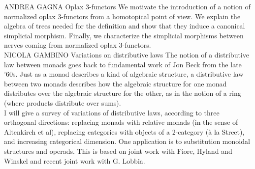 \documentclass[a3paper]{article}
\begin{document}


\talk
  {ANDREA GAGNA}
  {Oplax 3-functors}
  {We motivate the introduction of a notion of normalized oplax 3-functors from a homotopical point of view. We explain the algebra of trees needed for the definition and show that they induce a canonical simplicial morphism. Finally, we characterize the simplicial morphisms between nerves coming from normalized oplax 3-functors.}\\[1em]

\talk
  {NICOLA GAMBINO}
  {Variations on distributive laws}
  {The notion of a distributive law between monads goes back to fundamental work of Jon Beck from the late '60s. Just as a monad describes a kind of algebraic structure, a distributive law between two monads describes how the algebraic structure for one monad distributes over the algebraic structure for the other, as in the notion of a ring (where products distribute over sums). \\
  \indent I will give a survey of variations of distributive laws, according to three orthogonal directions: replacing monads with relative monads (in the sense of Altenkirch et al), replacing categories with objects of a 2-category (à la Street), and increasing categorical dimension. One application is to substitution monoidal structures and operads. This is based on joint work with Fiore, Hyland and Winskel and recent joint work with G. Lobbia.}


\end{document}
